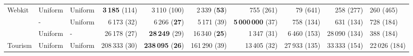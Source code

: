 \begin{tabular}[t]{lllrrrrrrl}
\multirow{-3}{*}{\raggedright\arraybackslash Webkit} & Uniform & Uniform & \textbf{3\,185} {\footnotesize(114)} & 3\,110 {\footnotesize(100)} & 2\,339 {\footnotesize(\textbf{53})} & 755 {\footnotesize(261)} & 79 {\footnotesize(641)} & 258 {\footnotesize(277)} & 260 {\footnotesize(465)}\\
\cmidrule{1-10}
 & - & Uniform & 6\,173 {\footnotesize(32)} & 6\,266 {\footnotesize(\textbf{27})} & 5\,171 {\footnotesize(39)} & \textbf{5\,000\,000} {\footnotesize(37)} & 758 {\footnotesize(134)} & 631 {\footnotesize(134)} & 728 {\footnotesize(184)}\\

 & Uniform & - & 26\,178 {\footnotesize(27)} & \textbf{28\,249} {\footnotesize(29)} & 16\,340 {\footnotesize(\textbf{25})} & 1\,347 {\footnotesize(31)} & 6\,460 {\footnotesize(153)} & 28\,090 {\footnotesize(134)} & 388 {\footnotesize(184)}\\

\multirow{-3}{*}{\raggedright\arraybackslash Tourism} & Uniform & Uniform & 208\,333 {\footnotesize(30)} & \textbf{238\,095} {\footnotesize(\textbf{26})} & 161\,290 {\footnotesize(39)} & 13\,405 {\footnotesize(32)} & 27\,933 {\footnotesize(135)} & 33\,333 {\footnotesize(154)} & 22\,026 {\footnotesize(184)}\\
\bottomrule
\end{tabular}